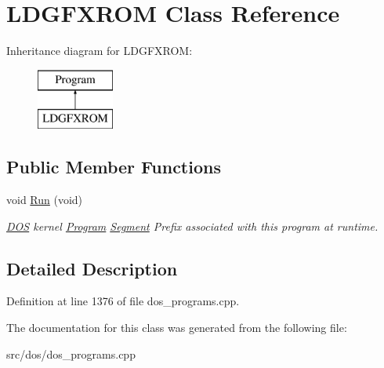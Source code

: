 \hypertarget{classLDGFXROM}{\section{L\-D\-G\-F\-X\-R\-O\-M Class Reference}
\label{classLDGFXROM}
}
Inheritance diagram for L\-D\-G\-F\-X\-R\-O\-M\-:\begin{figure}[H]
\begin{center}
\leavevmode
\includegraphics[height=2.000000cm]{classLDGFXROM}
\end{center}
\end{figure}
\subsection*{Public Member Functions}
\begin{DoxyCompactItemize}
\item 
\hypertarget{classLDGFXROM_aa4ee1bd38f082b0bb08d4fa9ed5f5626}{void \hyperlink{classLDGFXROM_aa4ee1bd38f082b0bb08d4fa9ed5f5626}{Run} (void)}\label{classLDGFXROM_aa4ee1bd38f082b0bb08d4fa9ed5f5626}

\begin{DoxyCompactList}\small\item\em \hyperlink{classDOS}{D\-O\-S} kernel \hyperlink{classProgram}{Program} \hyperlink{structSegment}{Segment} Prefix associated with this program at runtime. \end{DoxyCompactList}\end{DoxyCompactItemize}


\subsection{Detailed Description}


Definition at line 1376 of file dos\-\_\-programs.\-cpp.



The documentation for this class was generated from the following file\-:\begin{DoxyCompactItemize}
\item 
src/dos/dos\-\_\-programs.\-cpp\end{DoxyCompactItemize}
